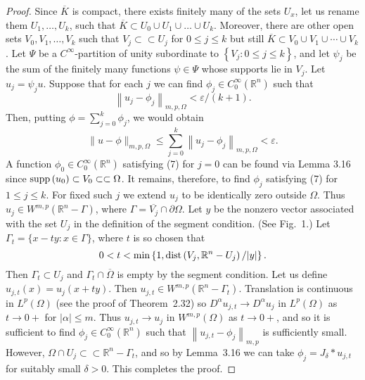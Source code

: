 \begin{proof}
  Since $\overline{K}$ is compact, there exists finitely many of the sets $U_x$,
  let us rename them $U_1, \ldots, U_k$,
  such that $\overline{K} \subset U_0 \cup U_1 \cup \ldots \cup U_k$.
  Moreover, there are other open sets $V_0, V_1, \ldots, V_k$
  such that $V_j \subset\subset U_j$ for $0 \leq j \leq k$
  but still $\overline{K} \subset V_0 \cup V_1 \cup \cdots \cup V_k$.
  Let $\Psi$ be a $C^{\infty}$-partition of unity subordinate to $\left\{V_j: 0 \leq j \leq k\right\}$, and let $\psi_j$ be the sum of the finitely many functions $\psi \in \Psi$ whose supports lie in $V_j$. Let $u_j=\psi_j u$. Suppose that for each $j$ we can find $\phi_j \in C_0^{\infty}\left(\mathbb{R}^n\right)$ such that
  \begin{equation}\label{eq:3.7}
    \left\|u_j-\phi_j\right\|_{m, p, \Omega}<\varepsilon /(k+1) .
  \end{equation}
  Then, putting $\phi=\sum_{j=0}^k \phi_j$, we would obtain
  \[
  \|u-\phi\|_{m, p, \Omega} \leq \sum_{j=0}^k\left\|u_j-\phi_j\right\|_{m, p, \Omega}<\varepsilon .
  \]
  A function $\phi_0 \in C_0^{\infty}\left(\mathbb{R}^n\right)$ satisfying (7) for $j=0$ can be 
  found via Lemma 3.16 since $\operatorname{supp}\left(u_0\right) \subset V_0 \subset\subset \Omega$.
  It remains, therefore, to find $\phi_j$ satisfying (7) for $1 \leq j \leq k$.
  For fixed such $j$ we extend $u_j$ to be identically zero outside $\Omega$.
  Thus $u_j \in W^{m,p}\left(\mathbb{R}^n-\Gamma\right)$,
  where $\Gamma=\overline{V_j} \cap\partial\Omega$.
  Let $y$ be the nonzero vector associated with the set $U_j$ in the definition of the segment 
  condition. (See Fig.~1.) Let $\Gamma_t=\{x-t y: x \in \Gamma\}$, where $t$ is so chosen that
  \[
  0<t<\min \left\{1, \operatorname{dist}\left(V_j, \mathbb{R}^n-U_j\right) /|y|\right\}.
  \]
  Then $\Gamma_t \subset U_j$ and $\Gamma_t \cap \overline{\Omega}$ is empty by the segment condition. 
  Let us define $u_{j, t}(x)=u_j(x+t y)$.
  Then $u_{j, t} \in W^{m,p}\left(\mathbb{R}^n-\Gamma_t\right)$.
  Translation is continuous in $L^p(\Omega)$ (see the proof of Theorem~2.32)
  so $D^\alpha u_{j, t} \rightarrow D^\alpha u_j$ in $L^p(\Omega)$
  as $t \rightarrow 0+$ for $|\alpha| \leq m$.
  Thus $u_{j, t} \rightarrow u_j$ in $W^{m,p}(\Omega)$ as $t \rightarrow 0+$,
  and so it is sufficient to find $\phi_j \in C_0^{\infty}\left(\mathbb{R}^n\right)$
  such that $\left\|u_{j, t}-\phi_j\right\|_{m,p}$ is sufficiently small.
  However, $\Omega \cap U_j \subset\subset \mathbb{R}^n-\Gamma_t$,
  and so by Lemma~3.16 we can take $\phi_j=J_\delta * u_{j, t}$ for suitably small $\delta>0$. 
  This completes the proof.
\end{proof}


